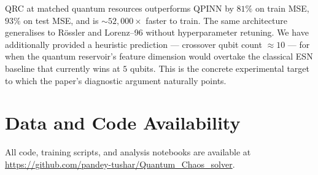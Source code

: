 \documentclass[11pt,a4paper]{article}
\begin{document}
QRC at matched quantum resources outperforms QPINN by $81\%$ on
train MSE, $93\%$ on test MSE, and is $\sim\!52{,}000\times$ faster
to train. The same architecture generalises to R\"{o}ssler and
Lorenz--96 without hyperparameter retuning. We have additionally
provided a heuristic prediction --- crossover qubit count
$\approx 10$ --- for when the quantum reservoir's feature dimension
would overtake the classical ESN baseline that currently wins at
$5$ qubits. This is the concrete experimental target to which the
paper's diagnostic argument naturally points.

\section*{Data and Code Availability}
\label{sec:availability}

All code, training scripts, and analysis notebooks are available at
\url{https://github.com/pandey-tushar/Quantum_Chaos_solver}.
\end{document}
